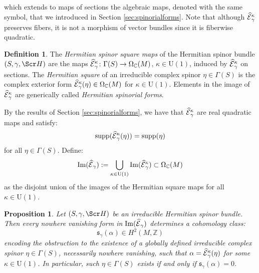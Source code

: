 \documentclass[10pt,a4paper,twoside,reqno]{amsart}
\theoremstyle{plain}
\newtheorem{prop}[thm]{Proposition}
\theoremstyle{definition}
\newtheorem{definition}[thm]{Definition}
\theoremstyle{remark}
\def\Z{\mathbb{Z}}
\def\C{\mathbb{C}}
\def\scS{\Scr H}
\def\U{\mathrm{U}}
\def\hcE{\smash{\widehat{\mathcal{E}}}}
\def\Im{\mathrm{Im}}
\begin{document}
which extends to maps of sections the algebraic maps, denoted with the same symbol, that we introduced in Section \ref{sec:spinorialforms}. Note that although $\hcE^\kappa_\gamma$ preserves fibers, it is not a morphism of vector bundles since it is fiberwise quadratic.

\begin{definition}
The \emph{Hermitian spinor square maps} of the Hermitian spinor bundle $(S,\gamma,\scS)$ are the maps $\hcE^\kappa_\gamma\colon\Gamma(S)\to\Omega_\C(M)$, $\kappa\in\U(1)$, induced by $\hcE^\kappa_\gamma$ on sections. The \emph{Hermitian square} of an irreducible complex spinor $\eta\in\Gamma(S)$ is the complex exterior form $\hcE^\kappa_\gamma(\eta)\in\Omega_\C(M)$ for $\kappa\in\U(1)$. Elements in the image of $\hcE^\kappa_\gamma$ are generically called \emph{Hermitian spinorial forms}.
\end{definition}

By the results of Section \ref{sec:spinorialforms}, we have that $\hcE^\kappa_\gamma$ are real quadratic maps and satisfy: $$\mathrm{supp}(\hcE^\kappa_\gamma(\eta))=\mathrm{supp}(\eta)$$ for all $\eta\in\Gamma(S)$. Define: $$\Im(\hcE_\gamma):=\bigcup_{\kappa\in\U(1)}\Im(\hcE^\kappa_\gamma)\subset\Omega_\C(M)$$ as the disjoint union of the images of the Hermitian square maps for all $\kappa\in\U(1)$.

\begin{prop}
\label{prop:spin_cohomology_class}
Let $(S,\gamma,\scS)$ be an irreducible Hermitian spinor bundle. Then every nowhere vanishing form in $\Im(\hcE_\gamma)$ determines a cohomology class:
\begin{equation*}
\mathfrak{s}_{\gamma}(\alpha)\in H^2(M,\Z)    
\end{equation*}
encoding the obstruction to the existence of a globally defined irreducible complex spinor $\eta\in\Gamma(S)$, necessarily nowhere vanishing, such that $\alpha=\hcE^\kappa_\gamma(\eta)$ for some $\kappa\in\U(1)$. In particular, such $\eta\in\Gamma(S)$ exists if and only if $\mathfrak{s}_{\gamma}(\alpha)=0$.
\end{prop}
\end{document}
